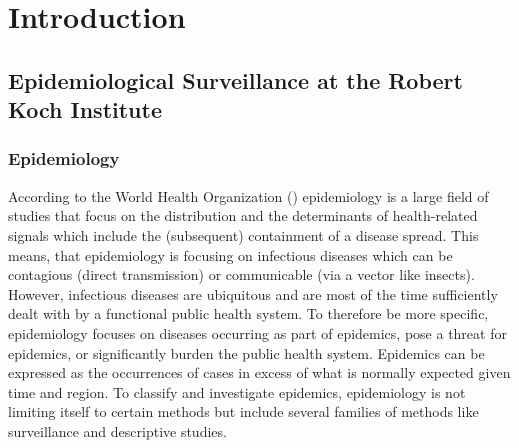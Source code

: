 \chapter{Introduction}
%
%
%


\section{Epidemiological Surveillance at the Robert Koch Institute}

\subsection{Epidemiology}
According to the World Health Organization () \cite{WHOepi} epidemiology is a large field of studies that focus
on the distribution and the determinants of health-related signals which include the (subsequent)
containment of a disease spread. This means, that epidemiology is focusing on infectious diseases which can be contagious (direct transmission) or communicable (via a vector like insects). However, infectious diseases are ubiquitous and are most of the time sufficiently dealt with by a functional public health system. To therefore be more specific, epidemiology focuses on diseases occurring as part of epidemics, pose a threat for epidemics, or significantly burden the public health system. Epidemics can be expressed as the occurrences of cases in excess of what is normally expected given time and region. To classify and investigate epidemics, epidemiology is not limiting itself to certain methods but include several families of methods like surveillance and descriptive studies.


